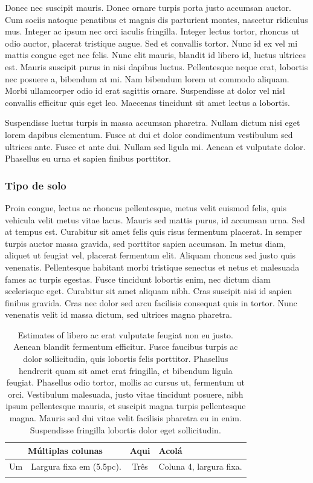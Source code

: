 \documentclass[book,A4paper,10pt,twoside,oldfontcommands]{memoir}\usepackage[]{graphicx}\usepackage[usenames,dvipsnames]{color}
\begin{document}
Donec nec suscipit mauris. Donec ornare turpis porta justo accumsan
auctor. Cum sociis natoque penatibus et magnis dis parturient montes,
nascetur ridiculus mus. Integer ac ipsum nec orci iaculis fringilla.
Integer lectus tortor, rhoncus ut odio auctor, placerat tristique
augue. Sed et convallis tortor. Nunc id ex vel mi mattis congue eget
nec felis. Nunc elit mauris, blandit id libero id, luctus ultrices
est. Mauris suscipit purus in nisi dapibus luctus. Pellentesque neque
erat, lobortis nec posuere a, bibendum at mi. Nam bibendum lorem ut
commodo aliquam. Morbi ullamcorper odio id erat sagittis ornare.
Suspendisse at dolor vel nisl convallis efficitur quis eget leo.
Maecenas tincidunt sit amet lectus a lobortis. 

Suspendisse luctus turpis in massa accumsan pharetra. Nullam dictum
nisi eget lorem dapibus elementum. Fusce at dui et dolor condimentum
vestibulum sed ultrices ante. Fusce et ante dui. Nullam sed ligula mi.
Aenean et vulputate dolor. Phasellus eu urna et sapien finibus
porttitor. 


\subsubsection{Tipo de solo}

Proin congue, lectus ac rhoncus pellentesque, metus velit euismod
felis, quis vehicula velit metus vitae lacus. Mauris sed mattis purus,
id accumsan urna. Sed at tempus est. Curabitur sit amet felis quis
risus fermentum placerat. In semper turpis auctor massa gravida, sed
porttitor sapien accumsan. In metus diam, aliquet ut feugiat vel,
placerat fermentum elit. Aliquam rhoncus sed justo quis venenatis.
Pellentesque habitant morbi tristique senectus et netus et malesuada
fames ac turpis egestas. Fusce tincidunt lobortis enim, nec dictum
diam scelerisque eget. Curabitur sit amet aliquam nibh. Cras suscipit
nisi id sapien finibus gravida. Cras nec dolor sed arcu facilisis
consequat quis in tortor. Nunc venenatis velit id massa dictum, sed
ultrices magna pharetra.


\begin{table}
\centering
\caption{Estimates of libero ac erat vulputate feugiat non
  eu justo. Aenean blandit fermentum efficitur. Fusce faucibus turpis
  ac dolor sollicitudin, quis lobortis felis porttitor. Phasellus
  hendrerit quam sit amet erat fringilla, et bibendum ligula feugiat.
  Phasellus odio tortor, mollis ac cursus ut, fermentum ut orci.
  Vestibulum malesuada, justo vitae tincidunt posuere, nibh ipsum
  pellentesque mauris, et suscipit magna turpis pellentesque magna.
  Mauris sed dui vitae velit facilisis pharetra eu in enim.
  Suspendisse fringilla lobortis dolor eget sollicitudin.}
\begin{tabular}{ c p{5.5pc} c p{5.5pc} } 
\hline
\multicolumn{2}{c}{Múltiplas colunas} & Aqui & Acolá \\ 
\hline
Um & \raggedright\arraybackslash Largura fixa em (5.5pc). & Três &
\raggedright\arraybackslash Coluna 4, largura fixa.\\
\hline
\label{Tab:estim}
\end{tabular}
\end{table}
\end{document}
